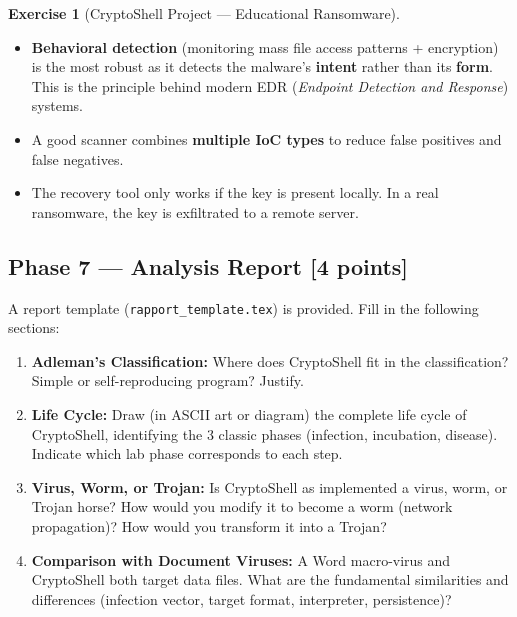 \documentclass[a4paper,11pt]{article}
\theoremstyle{plain}
\theoremstyle{definition}
\newtheorem{exercice}{Exercise}
\begin{document}
\begin{exercice}[CryptoShell Project --- Educational Ransomware]
\begin{correction}
\begin{pointcle}
\begin{itemize}
    \item \textbf{Behavioral detection} (monitoring mass file access patterns + encryption) is the most robust as it detects the malware's \textbf{intent} rather than its \textbf{form}. This is the principle behind modern EDR (\textit{Endpoint Detection and Response}) systems.
    \item A good scanner combines \textbf{multiple IoC types} to reduce false positives and false negatives.
    \item The recovery tool only works if the key is present locally. In a real ransomware, the key is exfiltrated to a remote server.
\end{itemize}
\end{pointcle}

\end{correction}



\subsection*{Phase 7 --- Analysis Report \hfill \normalsize [4 points]}

\noindent A report template (\texttt{rapport\_template.tex}) is provided. Fill in the following sections:

\begin{enumerate}
\item[\textbf{R1)}] \textbf{Adleman's Classification:} Where does CryptoShell fit in the classification? Simple or self-reproducing program? Justify.

\item[\textbf{R2)}] \textbf{Life Cycle:} Draw (in ASCII art or diagram) the complete life cycle of CryptoShell, identifying the 3 classic phases (infection, incubation, disease). Indicate which lab phase corresponds to each step.

\item[\textbf{R3)}] \textbf{Virus, Worm, or Trojan:} Is CryptoShell as implemented a virus, worm, or Trojan horse? How would you modify it to become a worm (network propagation)? How would you transform it into a Trojan?

\item[\textbf{R4)}] \textbf{Comparison with Document Viruses:} A Word macro-virus and CryptoShell both target data files. What are the fundamental similarities and differences (infection vector, target format, interpreter, persistence)?


\end{enumerate}
\end{exercice}
\end{document}
